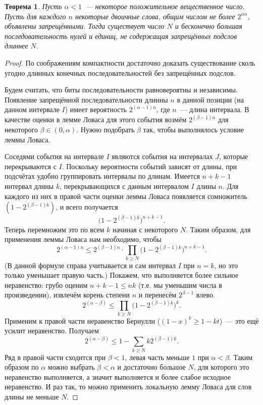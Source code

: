 \documentclass[12pt]{article}
\theoremstyle{definition}
\theoremstyle{plain}
\newtheorem{theorem}{Теорема}[section]
\theoremstyle{remark}
\begin{document}
\begin{theorem}
    Пусть $\alpha < 1$~--- некоторое положительное вещественное число.
    Пусть для каждого $n$ некоторые двоичные слова, общим числом не более $2^{\alpha n}$,
    объявлены запрещёнными. Тогда существует число $N$ и бесконечно большая последовательность
    нулей и единиц, не содержащая запрещённых подслов длиннее $N$.
\end{theorem}
\begin{proof}
    По соображениям компактности достаточно доказать существование сколь угодно длинных
    конечных последовательностей без запрещённых подслов.

    Будем считать, что биты последовательности равновероятны и независимы. Появление
    запрещённой последовательности длинны $n$ в данной позиции (на данном интервале $I$)
    имеет вероятность $2^{(\alpha - 1)n}$, где $n$~--- длина интервала. В качестве оценки
    в лемме Ловаса для этого события возмём $2^{(\beta - 1)n}$ для некоторого
    $\beta\in(0,\alpha)$. Нужно подобрать $\beta$ так, чтобы выполнялось условие леммы Ловаса.

    Соседями события на интервале $I$ являются события на интервалах $J$, которые перекрываются
    с $I$. Поскольку вероятности событий зависят от длины, при подсчётах удобно группировать
    интервалы по длинам. Имеется $n+k-1$ интервал длины $k$, перекрывающихся с данным интервалом $I$
    длины $n$. Для каждого из них в правой части оценки леммы Ловаса появляется сомножитель 
    $(1-2^{(\beta - 1)k})$, и всего получается
    \[
    \bigl(1-2^{(\beta - 1)k}\bigr)^{n+k-1}.
    \]
    Теперь перемножим это по всем $k$ начиная с некоторого $N$. Таким образом,
    для применения леммы Ловаса нам необходимо, чтобы
    \[
    2^{(\alpha - 1)n} \le 2^{(\beta - 1)n} \cdot \prod_{k\ge N}  
    \bigl(1-2^{(\beta - 1)k}\bigr)^{n+k-1}.
    \]
    (В данной формуле справа учитывается и сам интервал $I$ при $n=k$, 
    но это только уменьшает правую часть.) Покажем, что выполняется более сильное
    неравенство: грубо оценим $n+k - 1\le nk$ (т.е. мы уменьшим числа в произведении), 
    извлечём корень степени $n$ и перенесём $2^{\beta - 1}$ влево.
    \[
    2^{(\alpha - \beta)} 
    \le \prod_{k\ge N} \bigl(1-2^{(\beta - 1)k}\bigr)^k.
    \]           
    Применим к правой части неравенство Бернулли ($(1 - x)^k \ge 1 - kt$)~---
    это ещё усилит неравенство. Получаем
    \[
    2^{(\alpha - \beta)} \le 1 - \sum_{k\ge N} k2^{(\beta - 1)k}.
    \]
    Ряд в правой части сходится при $\beta < 1$, левая часть меньше $1$
    при $\alpha < \beta$. Таким образом по $\alpha$ можно выбрать $\beta<\alpha$ 
    и достаточно большое $N$, для которого это неравенство выполняется, а значит
    выполняется и более слабое исходное неравенство. И раз так, то можно применить 
    локальную лемму Ловаса для слов длины не меньше $N$. 
    

\end{proof}
\end{document}
